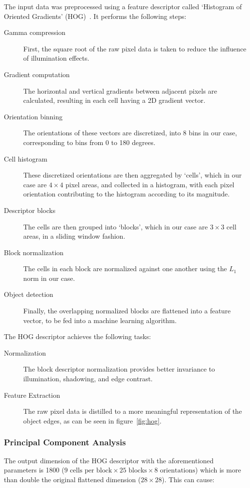 \documentclass[landscape,twocolumn]{article}
\begin{document}
The input data was preprocessed using a feature descriptor called `Histogram of Oriented Gradients' (HOG)~\cite{dalal2005histograms}. It performs the following steps:
\begin{description}
	\item[Gamma compression] First, the square root of the raw pixel data is taken to reduce the influence of illumination effects.
	\item[Gradient computation] The horizontal and vertical gradients between adjacent pixels are calculated, resulting in each cell having a 2D gradient vector.
	\item[Orientation binning] The orientations of these vectors are discretized, into 8 bins in our case, corresponding to bins from 0 to 180 degrees.
	\item[Cell histogram] These discretized orientations are then aggregated by `cells', which in our case are $4 \times 4$ pixel areas, and collected in a histogram, with each pixel orientation contributing to the histogram according to its magnitude.
	\item[Descriptor blocks] The cells are then grouped into `blocks', which in our case are $3 \times 3$ cell areas, in a sliding window fashion.
	\item[Block normalization] The cells in each block are normalized against one another using the $L_1$ norm in our case.
	\item[Object detection] Finally, the overlapping normalized blocks are flattened into a feature vector, to be fed into a machine learning algorithm.
\end{description}

The HOG descriptor achieves the following tasks:

\begin{description}
	\item[Normalization] The block descriptor normalization provides better invariance to illumination, shadowing, and edge contrast.
	\item[Feature Extraction] The raw pixel data is distilled to a more meaningful representation of the object edges, as can be seen in figure~\ref{fig:hog}.
\end{description}

\subsubsection{Principal Component Analysis}
The output dimension of the HOG descriptor with the aforementioned parameters is 1800 ($\text{9 cells per block} \times \text{25 blocks} \times \text{8 orientations}$) which is more than double the original flattened dimension ($28 \times 28$). This can cause:
\end{document}
